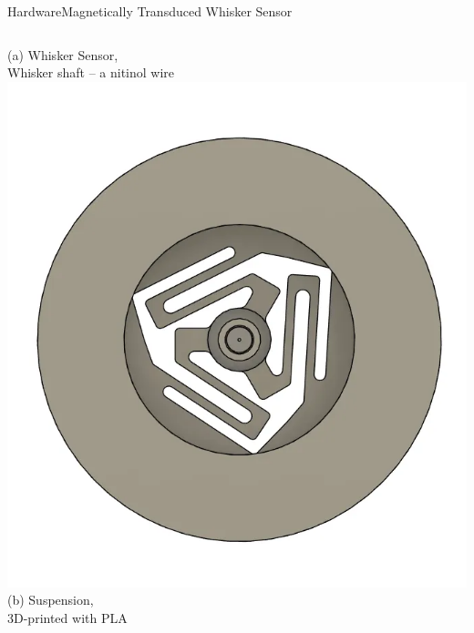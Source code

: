 \documentclass[AIRbeamer
,optEnglish
,optBiber
,optBibstyleAlphabetic
,optBeamerClassicFormat%
]{AIRlatex}
\begin{document}
\begin{frame}[c]{Hardware}{Magnetically Transduced Whisker Sensor}
\begin{columns}[c,onlytextwidth]
            (a) Whisker Sensor,\\Whisker shaft -- a nitinol wire
            \centering
            \includegraphics[height=0.6\textheight]{figures/suspension}\\
            (b) Suspension,\\3D-printed with PLA
            \centering

\end{columns}
\end{frame}
\end{document}
